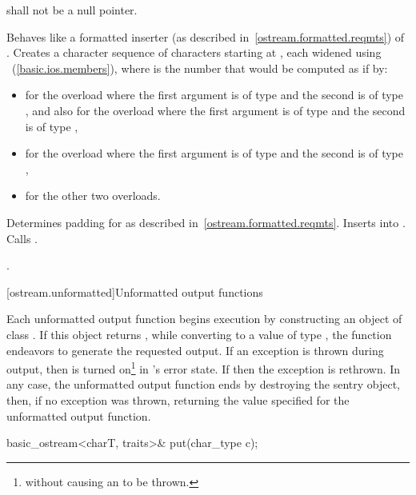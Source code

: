 \begin{itemdescr}
\pnum
\requires
{} shall not be a null pointer.

\pnum
\effects
Behaves like a formatted inserter (as described in~\ref{ostream.formatted.reqmts}) of .
Creates a character sequence  of  characters
starting at , each widened using
~(\ref{basic.ios.members}),
where  is the number that would be computed as if by:
\begin{itemize}
\item
{}
for the overload where the first argument is of type
and the second is of type
,
and also for the overload where the first argument is of type
and the second is of type
,
\item
{}
for the overload where the first argument is of type
and the second is of type
,
\item
{}
for the other two overloads.
\end{itemize}
Determines padding for  as described
in~\ref{ostream.formatted.reqmts}. Inserts  into
. Calls .

\pnum
\returns
{}.
\end{itemdescr}

[ostream.unformatted]{Unformatted output functions}

\pnum
Each
unformatted
output function begins execution by constructing an object of class
.
If this object returns
,
while converting to a value of type
,
the function endeavors
to generate the requested output.
If an exception is thrown during output, then
is turned on\footnote{without causing an
to be thrown.}
in
's
error state.
If
then the exception is rethrown.
In any case, the unformatted output function ends by destroying the
sentry object, then, if no exception was thrown, returning the value
specified for the unformatted output function.

%
\begin{itemdecl}
basic_ostream<charT, traits>& put(char_type c);
\end{itemdecl}

